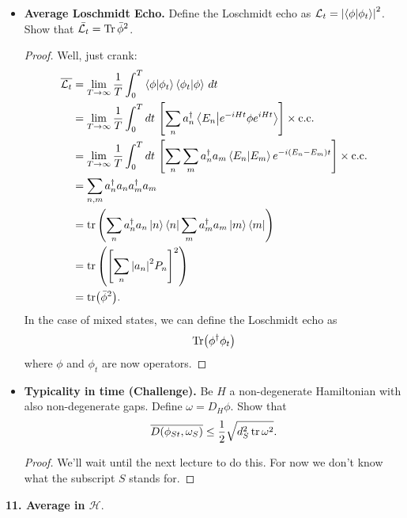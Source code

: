 \documentclass{book}
\theoremstyle{definition}
\newcommand{\lag}{\mathcal{L}}
\newcommand{\nn}{\nonumber}
\newcommand{\had}{\mathcal{H}}
\newcommand{\f}[2]{\frac{#1}{#2}}
\newcommand{\lp}{\left(}
\newcommand{\rp}{\right)}
\newcommand{\lb}{\left[}
\newcommand{\rb}{\right]}
\begin{document}
\begin{itemize}
	
	
	\item \textbf{Average Loschmidt Echo.} Define the Loschmidt echo as $\lag_t = \abs{\braket{\phi}{\phi_t}}^2$. Show that $\bar{\lag_t} = \Tr \bar{\phi}^2$.
	
	
	\begin{proof}
		Well, just crank:
		\begin{align}
		\overline{\lag_t} &= \lim_{T\to \infty}\f{1}{T}\int^T_0 \braket{\phi}{\phi_t}\braket{\phi_t}{\phi}\,dt\nn\\
		&= \lim_{T\to \infty}\f{1}{T}\int^T_0 dt\, \lb \sum_n a_n^\dagger \braket{E_n}{e^{-iHt}\phi e^{iHt}}  \rb \times \text{c.c.}\nn\\
		&= \lim_{T\to \infty}\f{1}{T}\int^T_0 dt\, \lb \sum_n \sum_m a_n^\dagger a_m \braket{E_n}{E_m} e^{-i(E_n - E_m)t}  \rb \times \text{c.c.}\nn\\
		&= \sum_{n,m} a^\dagger_n a_n a_m^\dagger a_m\nn\\
		&= \tr  \lp \sum_n a_n^\dagger a_n \ket{n}\bra{n} \sum_m a_m^\dagger a_m\ket{m}\bra{m} \rp \nn\\
		&= \tr \lp \lb \sum_n \abs{a_n}^2 P_n \rb^2  \rp   \nn\\
		&= \tr(\bar{\phi}^2).
		\end{align}
		In the case of mixed states, we can define the Loschmidt echo as
		\begin{align}
		\Tr(\phi^\dagger \phi_t)
		\end{align}
		where $\phi$ and $\phi_t$ are now operators. 
	\end{proof}
	
	
	\item \textbf{Typicality in time (Challenge).} Be $H$ a non-degenerate Hamiltonian with also non-degenerate gaps. Define $\omega = D_H \phi$. Show that 
	\begin{align}
	\overline{D(\phi_{St}, \omega_S)} \leq \f{1}{2}\sqrt{d_S^2\tr \omega^2}.
	\end{align}
	
	
	\begin{proof}
		We'll wait until the next lecture to do this. For now we don't know what the subscript $S$ stands for. 
	\end{proof}
	
	
	
	
	
	
\end{itemize}




\noindent \textbf{11. Average in $\had$}.
\end{document}
